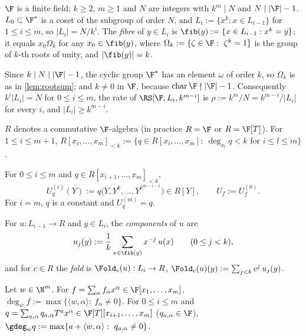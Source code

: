 \begin{definition}\label{def:domains}\leanok
$\F$ is a finite field; $k\ge 2$, $m\ge 1$ and $N$ are integers with $k^m\mid N$ and
$N\mid |\F|-1$. $L_0\subset\F^*$ is a coset of the subgroup of order $N$, and
$L_i:=\{x^k: x\in L_{i-1}\}$ for $1\le i\le m$, so $|L_i|=N/k^i$. The \emph{fibre} of
$y\in L_i$ is $\fib(y):=\{x\in L_{i-1}: x^k=y\}$; it equals $x_0\Omega_k$ for any
$x_0\in\fib(y)$, where $\Omega_k:=\{\zeta\in\F:\ \zeta^k=1\}$ is the group of $k$-th roots of unity, and $|\fib(y)|=k$.
\end{definition}

Since $k\mid N\mid|\F|-1$, the cyclic group $\F^*$ has an element $\omega$ of order $k$, so
$\Omega_k$ is as in \ref{lem:rootsum}; and $k\ne0$ in $\F$, because
$\operatorname{char}\F\nmid|\F|-1$. Consequently $k^i|L_i|=N$ for $0\le i\le m$, the rate of
$\RS[\F,L_i,k^{m-i}]$ is $\rho:=k^m/N=k^{m-i}/|L_i|$ for every $i$, and $|L_i|\ge k^{m-i}$.

\begin{definition}[Polynomials]\label{def:poly}\leanok
$R$ denotes a commutative $\F$-algebra (in practice $R=\F$ or $R=\F[T]$). For
$1\le i\le m+1$, $R[x_i,\dots,x_m]_{<k}:=\{q\in R[x_i,\dots,x_m]:\ \deg_{x_l}q<k\text{ for }i\le l\le m\}$.
\end{definition}

\begin{definition}\label{def:kron}\leanok
For $0\le i\le m$ and $q\in R[x_{i+1},\dots,x_m]_{<k}$,
\[
U^{(i)}_q(Y):=q\big(Y,Y^{k},\dots,Y^{k^{m-i-1}}\big)\in R[Y],\qquad U_f:=U^{(0)}_f .
\]
For $i=m$, $q$ is a constant and $U^{(m)}_q=q$.
\end{definition}

\begin{definition}[Fold]\label{def:fold}\leanok
For $u:L_{i-1}\to R$ and $y\in L_i$, the \emph{components} of $u$ are
\[
u_j(y):=\frac1k\sum_{x\in\fib(y)}x^{-j}\,u(x)\qquad(0\le j<k),
\]
and for $c\in R$ the \emph{fold} is $\Fold_c(u):L_i\to R$,
$\Fold_c(u)(y):=\sum_{j<k}c^j\,u_j(y)$.
\end{definition}

\begin{definition}\label{def:wdeg}\leanok
Let $w\in\N^m$. For $f=\sum_\alpha f_\alpha x^\alpha\in\F[x_1,\dots,x_m]$,
$\deg_w f:=\max\{\langle w,\alpha\rangle:\ f_\alpha\ne0\}$. For $0\le i\le m$ and
$q=\sum_{a,\alpha}q_{a,\alpha}T^ax^\alpha\in\F[T][x_{i+1},\dots,x_m]$ ($q_{a,\alpha}\in\F$),
$\gdeg_w q:=\max\{a+\langle w,\alpha\rangle:\ q_{a,\alpha}\ne0\}$.
\end{definition}

